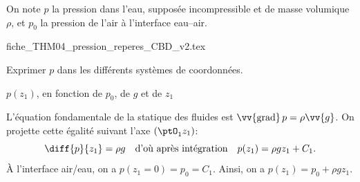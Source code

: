 \finEntrainement


\hauteurLargeurCadreReponse		{8mm}{3cm}
\typeEntrainement				{} %
\initialisationEntrainement

On note $p$ la pression dans l'eau, supposée incompressible et de masse volumique $\rho$, et $p_{0}$ la pression de l'air à l'interface eau--air.
\def\ratioScaleImage{1.7}
\begin{center}
{fiche_THM04_pression_reperes_CBD_v2.tex}
\end{center}

Exprimer $p$ dans les différents systèmes de coordonnées.



\debutEntrainement


\begin{enonce}
$p(z_{1})$, en fonction de $p_0$, de $g$ et de $z_1$
\end{enonce}


\begin{corrige}
L'équation fondamentale de la statique des fluides est $\vv{\text{grad}}\,p=\rho\vv{g}$. On projette cette égalité suivant l'axe $\left(\ptO_{1}z_{1}\right)$:
\[
\diff{p}{z_{1}}=\rho g\quad\text{d'où après intégration}\quad p(z_{1})=\rho gz_{1}+C_{1}.
\]
À l'interface air/eau, on a $p(z_{1}=0)=p_{0}=C_{1}$. Ainsi, on a $p\left(z_{1}\right)=p_{0}+\rho gz_{1}$.
\end{corrige}

